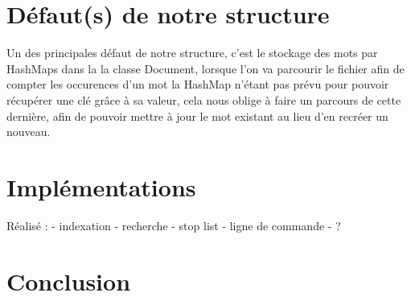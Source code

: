 \documentclass{article}
\begin{document}
\section{Défaut(s) de notre structure}

Un des principales défaut de notre structure, c'est le stockage des mots par HashMaps dans la
la classe Document, lorsque l'on va parcourir le fichier afin de compter les occurences d'un
mot la HashMap n'étant pas prévu pour pouvoir récupérer une clé grâce à sa valeur, cela nous
oblige à faire un parcours de cette dernière, afin de pouvoir mettre à jour le mot existant
au lieu d'en recréer un nouveau.


\section{Implémentations}

Réalisé :
- indexation
- recherche
- stop list
- ligne de commande
- ?




\section{Conclusion}
\end{document}
